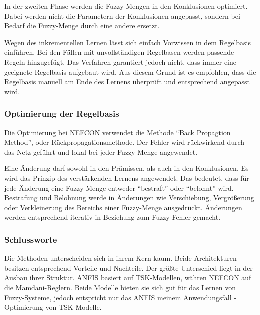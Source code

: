 In der zweiten Phase werden die Fuzzy-Mengen in den Konklusionen optimiert. Dabei werden nicht die Parametern der Konklusionen angepasst, sondern bei Bedarf die Fuzzy-Menge durch eine andere ersetzt.

Wegen des inkrementellen Lernen lässt sich einfach Vorwissen in dem Regelbasis einführen. Bei den Fällen mit unvollständigen Regelbasen werden passende Regeln hinzugefügt. Das Verfahren garantiert jedoch nicht, dass immer eine geeignete Regelbasis aufgebaut wird. Aus diesem Grund ist es empfohlen, dass die Regelbasis manuell am Ende des Lernens überprüft und entsprechend angepasst wird. \cite{CIKruse:15} \cite{UNIMAG:97}

\subsubsection{Optimierung der Regelbasis}

Die Optimierung bei NEFCON verwendet die Methode ``Back Propagtion Method'', oder Rückpropagationsmethode. Der Fehler wird rückwirkend durch das Netz geführt und lokal bei jeder Fuzzy-Menge angewendet.

Eine Änderung darf sowohl in den Prämissen, als auch in den Konklusionen. Es wird das Prinzip des verstärkenden Lernens angewendet. Das bedeutet, dass für jede Änderung eine Fuzzy-Menge entweder ``bestraft'' oder ``belohnt'' wird. Bestrafung und Belohnung werde in Änderungen wie Verschiebung, Vergrößerung oder Verkleinerung des Bereichs einer Fuzzy-Menge ausgedrückt. Änderungen werden entsprechend iterativ in Beziehung zum Fuzzy-Fehler gemacht. \cite{CIKruse:15} \cite{UNIMAG:97}

\subsubsection{Schlussworte}

Die Methoden unterscheiden sich in ihrem Kern kaum. Beide Architekturen besitzen entsprechend Vorteile und Nachteile. Der größte Unterschied liegt in der Ausbau ihrer Struktur. ANFIS basiert auf TSK-Modellen, währen NEFCON auf die Mamdani-Reglern. Beide Modelle bieten sie sich gut für das Lernen von Fuzzy-Systeme, jedoch entspricht nur das ANFIS meinem Anwendungsfall - Optimierung von TSK-Modelle.